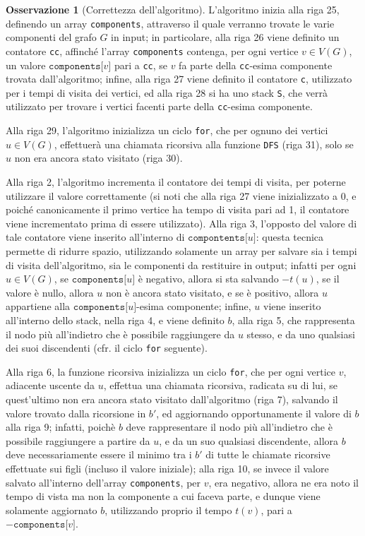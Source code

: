 \documentclass[14pt]{extreport}
\theoremstyle{definition}
\theoremstyle{definition}
\newtheorem{remark}{Osservazione}[subsection]
\begin{document}
\begin{remark}[Correttezza dell'algoritmo]
    L'algoritmo inizia alla riga 25, definendo un array \texttt{components}, attraverso il quale verranno trovate le varie componenti del grafo $G$ in input; in particolare, alla riga 26 viene definito un contatore \texttt{cc}, affinché l'array \texttt{components} contenga, per ogni vertice $v \in V(G)$, un valore $\texttt{components[}v\texttt{]}$ pari a \texttt{cc}, se $v$ fa parte della \texttt{cc}-esima componente trovata dall'algoritmo; infine, alla riga 27 viene definito il contatore \texttt{c}, utilizzato per i tempi di visita dei vertici, ed alla riga 28 si ha uno stack \texttt{S}, che verrà utilizzato per trovare i vertici facenti parte della \texttt{cc}-esima componente.
    
    Alla riga 29, l'algoritmo inizializza un ciclo \texttt{for}, che per ognuno dei vertici $u \in V(G)$, effettuerà una chiamata ricorsiva alla funzione \texttt{DFS} (riga 31), solo se $u$ non era ancora stato visitato (riga 30).

    Alla riga 2, l'algoritmo incrementa il contatore dei tempi di visita, per poterne utilizzare il valore correttamente (si noti che alla riga 27 viene inizializzato a 0, e poiché canonicamente il primo vertice ha tempo di visita pari ad 1, il contatore viene incrementato prima di essere utilizzato). Alla riga 3, l'opposto del valore di tale contatore viene inserito all'interno di $\texttt{compontents[}u\texttt{]}$: questa tecnica permette di ridurre spazio, utilizzando solamente un array per salvare sia i tempi di visita dell'algoritmo, sia le componenti da restituire in output; infatti per ogni $u \in V(G)$, se $\texttt{components[}u\texttt{]}$ è negativo, allora si sta salvando $-t(u)$, se il valore è nullo, allora $u$ non è ancora stato visitato, e se è positivo, allora $u$ appartiene alla $\texttt{components[}u\texttt{]}$-esima componente; infine, $u$ viene inserito all'interno dello stack, nella riga 4, e viene definito $b$, alla riga 5, che rappresenta il nodo più all'indietro che è possibile raggiungere da $u$ stesso, e da uno qualsiasi dei suoi discendenti (cfr. il ciclo \texttt{for} seguente).

    Alla riga 6, la funzione ricorsiva inizializza un ciclo \texttt{for}, che per ogni vertice $v$, adiacente uscente da $u$, effettua una chiamata ricorsiva, radicata su di lui, se quest'ultimo non era ancora stato visitato dall'algoritmo (riga 7), salvando il valore trovato dalla ricorsione in $b'$, ed aggiornando opportunamente il valore di $b$ alla riga 9; infatti, poichè $b$ deve rappresentare il nodo più all'indietro che è possibile raggiungere a partire da $u$, e da un suo qualsiasi discendente, allora $b$ deve necessariamente essere il minimo tra i $b'$ di tutte le chiamate ricorsive effettuate sui figli (incluso il valore iniziale); alla riga 10, se invece il valore salvato all'interno dell'array \texttt{components}, per $v$, era negativo, allora ne era noto il tempo di vista ma non la componente a cui faceva parte, e dunque viene solamente aggiornato $b$, utilizzando proprio il tempo $t(v)$, pari a $-\texttt{components[}v\texttt{]}$.


\end{remark}
\end{document}
